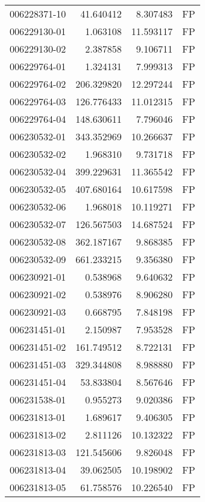 \begin{tabular}{lrrl}
006228371-10 &   41.640412 &       8.307483 &   FP \\
006229130-01 &    1.063108 &      11.593117 &   FP \\
006229130-02 &    2.387858 &       9.106711 &   FP \\
006229764-01 &    1.324131 &       7.999313 &   FP \\
006229764-02 &  206.329820 &      12.297244 &   FP \\
006229764-03 &  126.776433 &      11.012315 &   FP \\
006229764-04 &  148.630611 &       7.796046 &   FP \\
006230532-01 &  343.352969 &      10.266637 &   FP \\
006230532-02 &    1.968310 &       9.731718 &   FP \\
006230532-04 &  399.229631 &      11.365542 &   FP \\
006230532-05 &  407.680164 &      10.617598 &   FP \\
006230532-06 &    1.968018 &      10.119271 &   FP \\
006230532-07 &  126.567503 &      14.687524 &   FP \\
006230532-08 &  362.187167 &       9.868385 &   FP \\
006230532-09 &  661.233215 &       9.356380 &   FP \\
006230921-01 &    0.538968 &       9.640632 &   FP \\
006230921-02 &    0.538976 &       8.906280 &   FP \\
006230921-03 &    0.668795 &       7.848198 &   FP \\
006231451-01 &    2.150987 &       7.953528 &   FP \\
006231451-02 &  161.749512 &       8.722131 &   FP \\
006231451-03 &  329.344808 &       8.988880 &   FP \\
006231451-04 &   53.833804 &       8.567646 &   FP \\
006231538-01 &    0.955273 &       9.020386 &   FP \\
006231813-01 &    1.689617 &       9.406305 &   FP \\
006231813-02 &    2.811126 &      10.132322 &   FP \\
006231813-03 &  121.545606 &       9.826048 &   FP \\
006231813-04 &   39.062505 &      10.198902 &   FP \\
006231813-05 &   61.758576 &      10.226540 &   FP \\

\end{tabular}
